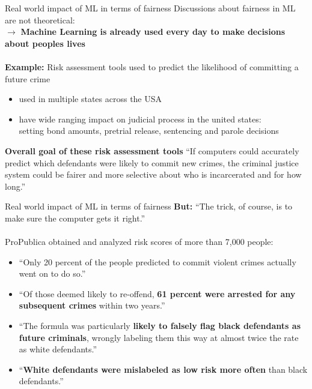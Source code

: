 \begin{frame}{Real world impact of ML in terms of fairness \cite{machinebias}}
    Discussions about fairness in ML are not theoretical: \\
    $\rightarrow$ \textbf{Machine Learning is already used every day to make decisions about peoples lives} \\~\\
    
    \textbf{Example:} Risk assessment tools used to predict the likelihood of committing a future crime
    \begin{itemize}
        \item used in multiple states across the USA
        \item have wide ranging impact on judicial process in the united states: \\
        setting bond amounts, pretrial release, sentencing and parole decisions
    \end{itemize}
    
    \begin{block}{\textbf{Overall goal of these risk assessment tools}}
        \enquote{If computers could accurately predict which defendants were likely to commit new crimes, the criminal justice system could be fairer and more selective about who is incarcerated and for how long.}
    \end{block}
\end{frame}

\begin{frame}{Real world impact of ML in terms of fairness \cite{machinebias}}
    \textbf{But:} \enquote{The trick, of course, is to make sure the computer gets it right.} \\~\\
    
    ProPublica obtained and analyzed risk scores of more than 7,000 people:
    
    \begin{itemize}
        \item \enquote{Only 20 percent of the people predicted to commit violent crimes actually went on to do so.}
        \item \enquote{Of those deemed likely to re-offend, \textbf{61 percent were arrested for any subsequent crimes} within two years.}
        \item \enquote{The formula was particularly \textbf{likely to falsely flag black defendants as future criminals}, wrongly labeling them this way at almost twice the rate as white defendants.}
        \item \enquote{\textbf{White defendants were mislabeled as low risk more often} than black defendants.}
    \end{itemize}
\end{frame}